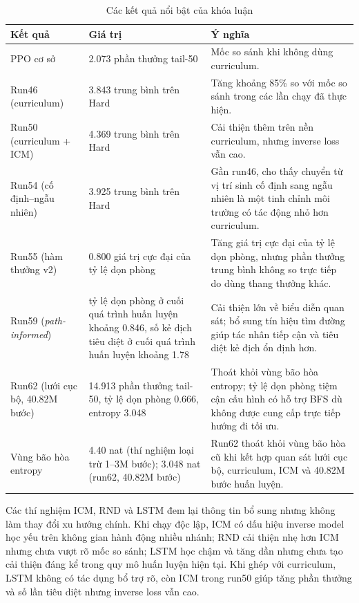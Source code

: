 \begin{table}[H]
    \centering
    \small
    \caption{Các kết quả nổi bật của khóa luận}
    \label{tab:conclusion_best_results}
    \begin{tabular}{|p{4.0cm}|p{3.5cm}|p{6.5cm}|}
        \hline
        \textbf{Kết quả} & \textbf{Giá trị} & \textbf{Ý nghĩa} \\
        \hline
        PPO cơ sở & 2.073 phần thưởng tail-50 & Mốc so sánh khi không dùng curriculum. \\
        \hline
        Run46 (curriculum) & 3.843 trung bình trên Hard & Tăng khoảng 85\% so với mốc so sánh trong các lần chạy đã thực hiện. \\
        \hline
        Run50 (curriculum + ICM) & 4.369 trung bình trên Hard & Cải thiện thêm trên nền curriculum, nhưng inverse loss vẫn cao. \\
        \hline
        Run54 (cố định--ngẫu nhiên) & 3.925 trung bình trên Hard & Gần run46, cho thấy chuyển từ vị trí sinh cố định sang ngẫu nhiên là một tinh chỉnh môi trường có tác động nhỏ hơn curriculum. \\
        \hline
        Run55 (hàm thưởng v2) & 0.800 giá trị cực đại của tỷ lệ dọn phòng & Tăng giá trị cực đại của tỷ lệ dọn phòng, nhưng phần thưởng trung bình không so trực tiếp do dùng thang thưởng khác. \\
        \hline
        Run59 (\emph{path-informed}) & tỷ lệ dọn phòng ở cuối quá trình huấn luyện khoảng 0.846, số kẻ địch tiêu diệt ở cuối quá trình huấn luyện khoảng 1.78 & Cải thiện lớn về biểu diễn quan sát; bổ sung tín hiệu tìm đường giúp tác nhân tiếp cận và tiêu diệt kẻ địch ổn định hơn. \\
        \hline
        Run62 (lưới cục bộ, 40.82M bước) & 14.913 phần thưởng tail-50, tỷ lệ dọn phòng 0.666, entropy 3.048 & Thoát khỏi vùng bão hòa entropy; tỷ lệ dọn phòng tiệm cận cấu hình có hỗ trợ BFS dù không được cung cấp trực tiếp hướng đi tối ưu. \\
        \hline
        Vùng bão hòa entropy & 4.40 nat (thí nghiệm loại trừ 1--3M bước); 3.048 nat (run62, 40.82M bước) & Run62 thoát khỏi vùng bão hòa cũ khi kết hợp quan sát lưới cục bộ, curriculum, ICM và 40.82M bước huấn luyện. \\
        \hline
    \end{tabular}
\end{table}

Các thí nghiệm ICM, RND và LSTM đem lại thông tin bổ sung nhưng không làm thay đổi xu hướng chính. Khi chạy độc lập, ICM có dấu hiệu inverse model học yếu trên không gian hành động nhiều nhánh; RND cải thiện nhẹ hơn ICM nhưng chưa vượt rõ mốc so sánh; LSTM học chậm và tăng dần nhưng chưa tạo cải thiện đáng kể trong quy mô huấn luyện hiện tại. Khi ghép với curriculum, LSTM không có tác dụng bổ trợ rõ, còn ICM trong run50 giúp tăng phần thưởng và số lần tiêu diệt nhưng inverse loss vẫn cao.

